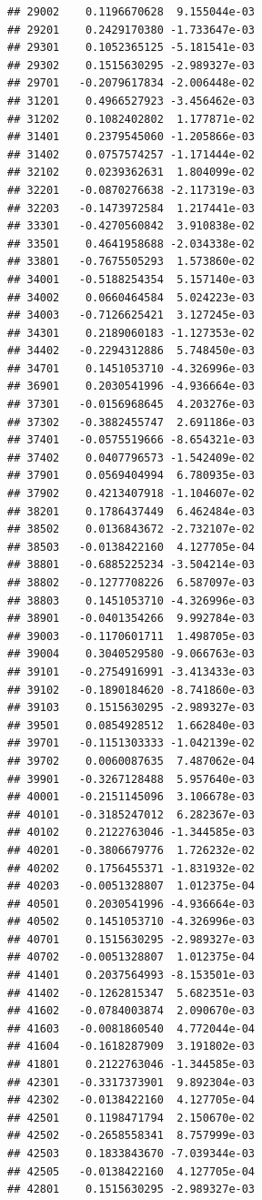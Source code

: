 \documentclass[ignorenonframetext,]{beamer}
\begin{document}
\begin{frame}[fragile]
\begin{verbatim}
## 29002    0.1196670628  9.155044e-03
## 29201    0.2429170380 -1.733647e-03
## 29301    0.1052365125 -5.181541e-03
## 29302    0.1515630295 -2.989327e-03
## 29701   -0.2079617834 -2.006448e-02
## 31201    0.4966527923 -3.456462e-03
## 31202    0.1082402802  1.177871e-02
## 31401    0.2379545060 -1.205866e-03
## 31402    0.0757574257 -1.171444e-02
## 32102    0.0239362631  1.804099e-02
## 32201   -0.0870276638 -2.117319e-03
## 32203   -0.1473972584  1.217441e-03
## 33301   -0.4270560842  3.910838e-02
## 33501    0.4641958688 -2.034338e-02
## 33801   -0.7675505293  1.573860e-02
## 34001   -0.5188254354  5.157140e-03
## 34002    0.0660464584  5.024223e-03
## 34003   -0.7126625421  3.127245e-03
## 34301    0.2189060183 -1.127353e-02
## 34402   -0.2294312886  5.748450e-03
## 34701    0.1451053710 -4.326996e-03
## 36901    0.2030541996 -4.936664e-03
## 37301   -0.0156968645  4.203276e-03
## 37302   -0.3882455747  2.691186e-03
## 37401   -0.0575519666 -8.654321e-03
## 37402    0.0407796573 -1.542409e-02
## 37901    0.0569404994  6.780935e-03
## 37902    0.4213407918 -1.104607e-02
## 38201    0.1786437449  6.462484e-03
## 38502    0.0136843672 -2.732107e-02
## 38503   -0.0138422160  4.127705e-04
## 38801   -0.6885225234 -3.504214e-03
## 38802   -0.1277708226  6.587097e-03
## 38803    0.1451053710 -4.326996e-03
## 38901   -0.0401354266  9.992784e-03
## 39003   -0.1170601711  1.498705e-03
## 39004    0.3040529580 -9.066763e-03
## 39101   -0.2754916991 -3.413433e-03
## 39102   -0.1890184620 -8.741860e-03
## 39103    0.1515630295 -2.989327e-03
## 39501    0.0854928512  1.662840e-03
## 39701   -0.1151303333 -1.042139e-02
## 39702    0.0060087635  7.487062e-04
## 39901   -0.3267128488  5.957640e-03
## 40001   -0.2151145096  3.106678e-03
## 40101   -0.3185247012  6.282367e-03
## 40102    0.2122763046 -1.344585e-03
## 40201   -0.3806679776  1.726232e-02
## 40202    0.1756455371 -1.831932e-02
## 40203   -0.0051328807  1.012375e-04
## 40501    0.2030541996 -4.936664e-03
## 40502    0.1451053710 -4.326996e-03
## 40701    0.1515630295 -2.989327e-03
## 40702   -0.0051328807  1.012375e-04
## 41401    0.2037564993 -8.153501e-03
## 41402   -0.1262815347  5.682351e-03
## 41602   -0.0784003874  2.090670e-03
## 41603   -0.0081860540  4.772044e-04
## 41604   -0.1618287909  3.191802e-03
## 41801    0.2122763046 -1.344585e-03
## 42301   -0.3317373901  9.892304e-03
## 42302   -0.0138422160  4.127705e-04
## 42501    0.1198471794  2.150670e-02
## 42502   -0.2658558341  8.757999e-03
## 42503    0.1833843670 -7.039344e-03
## 42505   -0.0138422160  4.127705e-04
## 42801    0.1515630295 -2.989327e-03

\end{verbatim}
\end{frame}
\end{document}
